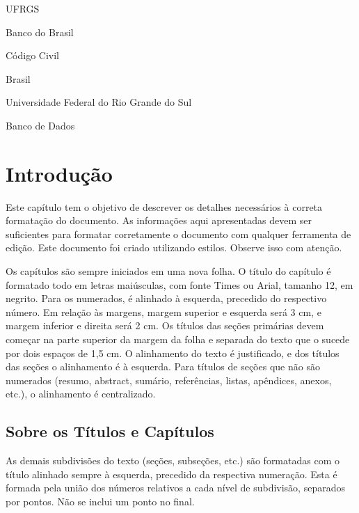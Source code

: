 \documentclass[ppgc,diss]{iiufrgs}
\begin{document}
\listoffigures
\listoftables
\begin{listofabbrv}{UFRGS}
    \item[BB] Banco do Brasil
    \item[CC] Código Civil
    \item[BR] Brasil
    \item[UFRGS] Universidade Federal do Rio Grande do Sul
    \item[BD] Banco de Dados
\end{listofabbrv}
\tableofcontents


\chapter{Introdução}

Este capítulo tem o objetivo de descrever os detalhes necessários à correta
formatação do documento.  As informações aqui apresentadas devem ser
suficientes para formatar corretamente o documento com qualquer ferramenta de
edição.  Este documento foi criado utilizando estilos.  Observe isso com
atenção.

Os capítulos são sempre iniciados em uma nova folha.  O título do capítulo é
formatado todo em letras maiúsculas, com fonte Times ou Arial, tamanho 12, em
negrito.  Para os numerados, é alinhado à esquerda, precedido do respectivo
número.  Em relação às margens, margem superior e esquerda será 3 cm, e margem
inferior e direita será 2 cm.  Os títulos das seções primárias devem começar na
parte superior da margem da folha e separada do texto que o sucede por dois
espaços de 1,5 cm.  O alinhamento do texto é justificado, e dos títulos das
seções o alinhamento é à esquerda.  Para títulos de seções que não são
numerados (resumo, abstract, sumário, referências, listas, apêndices, anexos,
etc.), o alinhamento é centralizado.

\section{Sobre os Títulos e Capítulos}

As demais subdivisões do texto (seções, subseções, etc.) são formatadas com o
título alinhado sempre à esquerda, precedido da respectiva numeração. Esta é
formada pela união dos números relativos a cada nível de subdivisão, separados
por pontos. Não se inclui um ponto no final.
\end{document}
